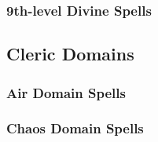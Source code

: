 \subsubsection{9th-level Divine Spells}
\begin{spelllist}
    \SLavatarofchaos
    \SLavataroforder
    \SLavataroflife
    \SLearthquake
    \SLholyavatar
    \SLimplosion
    \SLstormofvengeance
    \SLunholyavatar
\end{spelllist}

\subsection{Cleric Domains}\label{Cleric Domains}

\begin{comment}
\subsubsection{Example Domain}
\parhead{Domain Power}
\parhead{Channelled Domain Power}
\parhead[Greate] Domain Power}
\parhead[Greate] Channelled Domain Power}
\parhead{Domain Mastery}
\begin{spelllist}
    \spellhead[1]{}
    \spellhead[1]{}
    \spellhead[2]{}
    \spellhead[2]{}
    \spellhead[3]{}
    \spellhead[3]{}
    \spellhead[4]{}
    \spellhead[4]{}
    \spellhead[5]{}
    \spellhead[5]{}
    \spellhead[6]{}
    \spellhead[6]{}
    \spellhead[7]{}
    \spellhead[7]{}
    \spellhead[8]{}
    \spellhead[8]{}
    \spellhead[9]{}
    \spellhead[9]{}
\end{spelllist}
\end{comment}

\subsubsection{Air Domain Spells}

\begin{spelllist}
    \SLgentledescent[1]
    \SLwindstrike[2]
    \SLcalllightning[3]
    \SLairwalk[4]
    \SLstormlord[5]
    \SLchainlightning[6]
    \SLavatarofwind[7]
    \SLreversegravity[8]
    \SLstormofvengeance[9]
\end{spelllist}

\subsubsection{Chaos Domain Spells}

\begin{spelllist}
    \SLprotectionfromalignment[1]
    \SLswarmofbats[2]
    \SLchaoshammer[3]
    \SLconfusion[4]
    \SLcacaphonicword[5]
    \SLprismaticspray[6]
    \SLdiscordantsong[7]
    \SLreversegravity[8]
    \SLavatarofchaos[9]
\end{spelllist}


